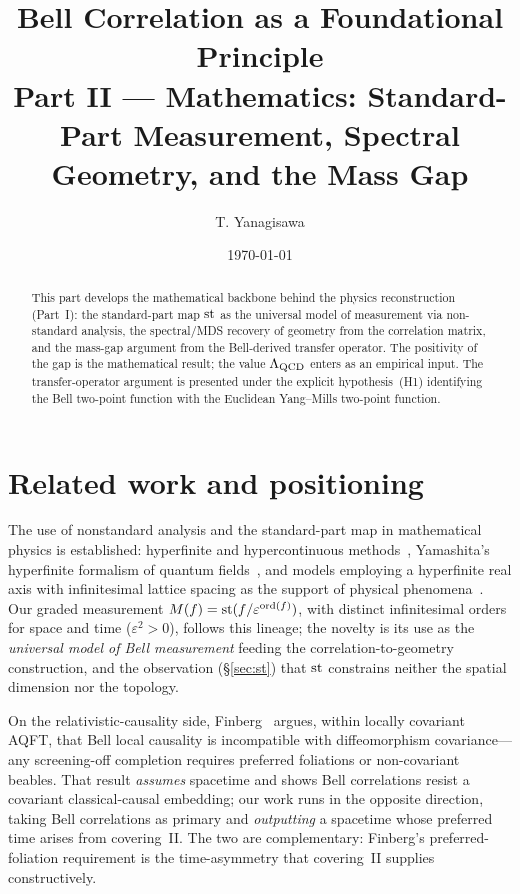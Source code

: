 \documentclass[11pt]{article}
\title{Bell Correlation as a Foundational Principle\\
\large Part II --- Mathematics: Standard-Part Measurement, Spectral Geometry, and the Mass Gap}
\author{T. Yanagisawa}
\date{\today}
\begin{document}
\maketitle

\begin{abstract}
This part develops the mathematical backbone behind the physics reconstruction
(Part~I): the standard-part map $\operatorname{st}$ as the universal model of measurement via
non-standard analysis, the spectral/MDS recovery of geometry from the correlation
matrix, and the mass-gap argument from the Bell-derived transfer operator. The
positivity of the gap is the mathematical result; the value $\Lambda_{\mathrm{QCD}}$ enters as an
empirical input. The transfer-operator argument is presented under the explicit
hypothesis~(H1) identifying the Bell two-point function with the Euclidean
Yang--Mills two-point function.
\end{abstract}

\tableofcontents

\section{Related work and positioning}\label{sec:math-related}
The use of nonstandard analysis and the standard-part map in mathematical physics is
established: hyperfinite and hypercontinuous methods~\cite{albeverio}, Yamashita's
hyperfinite formalism of quantum fields~\cite{yamashita}, and models employing a
hyperfinite real axis with infinitesimal lattice spacing as the support of physical
phenomena~\cite{nsa-qm}. Our graded measurement $M(f)=\operatorname{st}(f/\varepsilon^{\operatorname{ord}(f)})$,
with distinct infinitesimal orders for space and time ($\varepsilon^2>0$), follows this
lineage; the novelty is its use as the \emph{universal model of Bell measurement} feeding
the correlation-to-geometry construction, and the observation (\S\ref{sec:st}) that $\operatorname{st}$
constrains neither the spatial dimension nor the topology.

On the relativistic-causality side, Finberg~\cite{finberg} argues, within locally
covariant AQFT, that Bell local causality is incompatible with diffeomorphism
covariance---any screening-off completion requires preferred foliations or non-covariant
beables. That result \emph{assumes} spacetime and shows Bell correlations resist a
covariant classical-causal embedding; our work runs in the opposite direction, taking
Bell correlations as primary and \emph{outputting} a spacetime whose preferred time
arises from covering~II. The two are complementary: Finberg's preferred-foliation
requirement is the time-asymmetry that covering~II supplies constructively.
\end{document}

